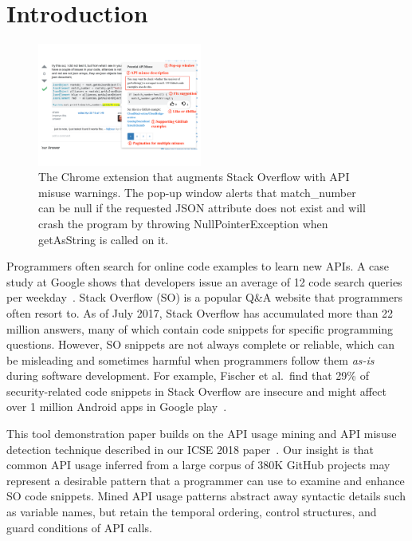 \section{Introduction}
\label{sec:intro}

\begin{figure}
\centering
\includegraphics[width=0.48\textwidth]{examplecheck-screenshot.pdf}
  \caption{The {\tool} Chrome extension that augments Stack Overflow with API misuse warnings. The pop-up window alerts that {\ttt match\_number} can be {\ttt null} if the requested {\ttt JSON} attribute does not exist and will crash the program by throwing {\ttt NullPointerException} when {\ttt getAsString} is called on it.}
  \label{fig:screenshot}
  \vspace{-0.in}
\end{figure}

Programmers often search for online code examples to learn new APIs. A case study at Google shows that developers issue an average of 12 code search queries per weekday~\cite{sadowski2015developers}. Stack Overflow (SO) is a popular Q\&A website that programmers often resort to. As of July 2017, Stack Overflow has accumulated more than 22 million answers, many of which contain code snippets for specific programming questions. However, SO snippets are not always complete or reliable, which can be misleading and sometimes harmful when programmers follow them {\em as-is} during software development. For example, Fischer et al.~find that 29\% of security-related code snippets in Stack Overflow are insecure and might affect over 1 million Android apps in Google play~\cite{fischer2017stack}. 

This tool demonstration paper builds on the API usage mining and API misuse detection technique described in our ICSE 2018 paper~\cite{zhang2018code}. Our insight is that common API usage inferred from a large corpus of 380K GitHub projects may represent a desirable pattern that a programmer can use to examine and enhance SO code snippets. Mined API usage patterns abstract away syntactic details such as variable names, but retain the temporal ordering, control structures, and guard conditions of API calls. 

